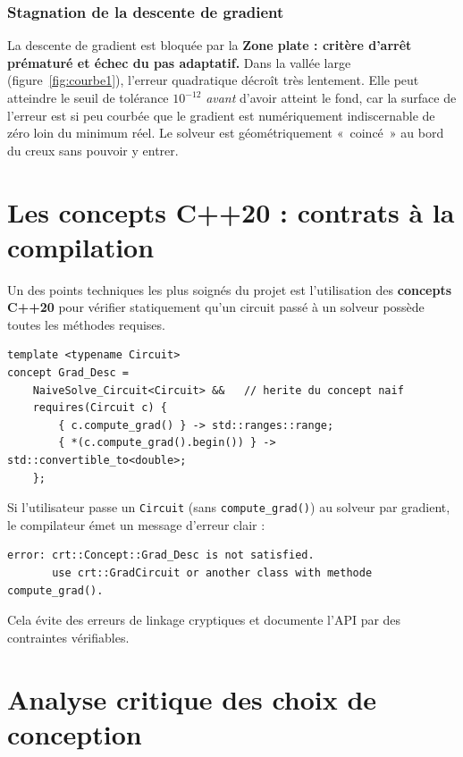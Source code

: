 \documentclass[12pt,a4paper]{article}
\begin{document}
\subsubsection{Stagnation de la descente de gradient}
 
La descente de gradient est bloquée par la \textbf{Zone plate : critère d'arrêt prématuré et échec du pas adaptatif.}
Dans la vallée large (figure~\ref{fig:courbe1}), l'erreur quadratique
décroît très lentement. Elle peut atteindre le seuil de tolérance
$10^{-12}$ \emph{avant} d'avoir atteint le fond, car la surface de l'erreur est si peu courbée
que le gradient est numériquement indiscernable de zéro loin du minimum réel.
Le solveur est géométriquement «~coincé~» au bord du creux sans pouvoir
y entrer.


\section{Les concepts C++20 : contrats à la compilation}

Un des points techniques les plus soignés du projet est l'utilisation des
\textbf{concepts C++20} pour vérifier statiquement qu'un circuit passé à un solveur
possède toutes les méthodes requises.

\begin{lstlisting}[caption={Concept Grad\_Desc (crtConcept.hpp)}]
template <typename Circuit>
concept Grad_Desc =
    NaiveSolve_Circuit<Circuit> &&   // herite du concept naif
    requires(Circuit c) {
        { c.compute_grad() } -> std::ranges::range;
        { *(c.compute_grad().begin()) } -> std::convertible_to<double>;
    };
\end{lstlisting}

Si l'utilisateur passe un \texttt{Circuit} (sans \texttt{compute\_grad()}) au
solveur par gradient, le compilateur émet un message d'erreur clair :

\begin{verbatim}
error: crt::Concept::Grad_Desc is not satisfied.
       use crt::GradCircuit or another class with methode compute_grad().
\end{verbatim}

Cela évite des erreurs de linkage cryptiques et documente l'API par des
contraintes vérifiables.

\section{Analyse critique des choix de conception}
\label{sec:critique}
\end{document}

